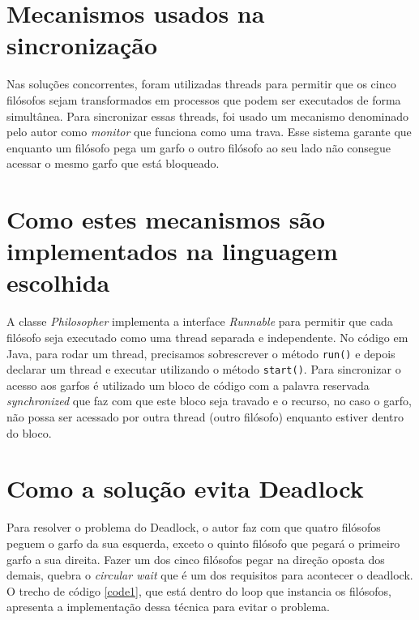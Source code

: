 \documentclass[conference]{IEEEtran}
\begin{document}
\section{Mecanismos usados na sincronização}
Nas soluções concorrentes, foram utilizadas threads para permitir que os cinco filósofos sejam transformados em processos que podem ser executados de forma simultânea.
Para sincronizar essas threads, foi usado um mecanismo denominado pelo autor como \textit{monitor}\cite{baeldung_java} que funciona como uma trava.
Esse sistema garante que enquanto um filósofo pega um garfo o outro filósofo ao seu lado não consegue acessar o mesmo garfo que está bloqueado.

\section{Como estes mecanismos são implementados na linguagem escolhida}

A classe \textit{Philosopher} implementa a interface \textit{Runnable} para permitir que cada filósofo seja executado como uma thread separada e independente.
No código em Java, para rodar um thread, precisamos sobrescrever o método \verb|run()| e depois declarar um thread e executar utilizando o método \verb|start()|.
Para sincronizar o acesso aos garfos é utilizado um bloco de código com a palavra reservada \textit{synchronized} que faz com que este bloco seja travado e o recurso, no caso o garfo, não possa ser acessado por outra thread (outro filósofo) enquanto estiver dentro do bloco.

\section{Como a solução evita Deadlock}

Para resolver o problema do Deadlock, o autor faz com que quatro filósofos peguem o garfo da sua esquerda, exceto o quinto filósofo que pegará o primeiro garfo a sua direita.
Fazer um dos cinco filósofos pegar na direção oposta dos demais, quebra o \textit{circular wait} que é um dos requisitos para acontecer o deadlock\cite{baeldung_java}.
O trecho de código \ref{code1}, que está dentro do loop que instancia os filósofos, apresenta a implementação dessa técnica para evitar o problema.


\end{document}
